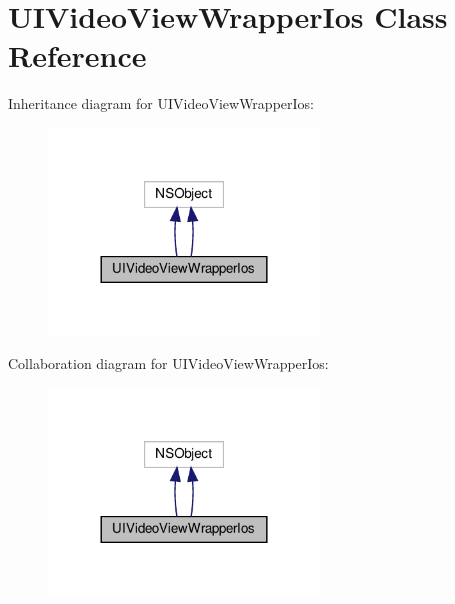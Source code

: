 \hypertarget{interfaceUIVideoViewWrapperIos}{}\section{U\+I\+Video\+View\+Wrapper\+Ios Class Reference}
\label{interfaceUIVideoViewWrapperIos}


Inheritance diagram for U\+I\+Video\+View\+Wrapper\+Ios\+:
\nopagebreak
\begin{figure}[H]
\begin{center}
\leavevmode
\includegraphics[width=204pt]{interfaceUIVideoViewWrapperIos__inherit__graph}
\end{center}
\end{figure}


Collaboration diagram for U\+I\+Video\+View\+Wrapper\+Ios\+:
\nopagebreak
\begin{figure}[H]
\begin{center}
\leavevmode
\includegraphics[width=204pt]{interfaceUIVideoViewWrapperIos__coll__graph}
\end{center}
\end{figure}
